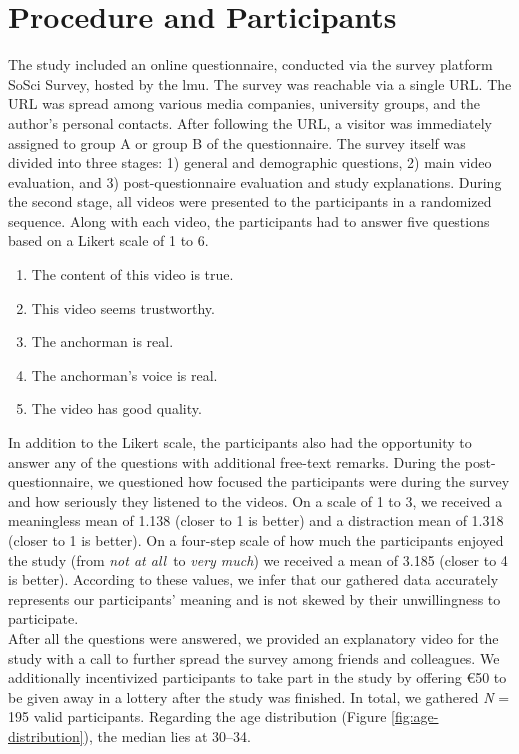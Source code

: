 \documentclass[
  a4paper,  %
  twoside,  %
  bibliography=totoc,
  headsepline,
  cleardoublepage=empty,
  parskip=half,
  draft=false
]{scrbook}
\begin{document}
\section{Procedure and Participants}
\label{sec:procedure-and-participants}

The study included an online questionnaire, conducted via the survey platform SoSci Survey, hosted by the \gls{lmu}. The survey was reachable via a single URL. The URL was spread among various media companies, university groups, and the author's personal contacts. After following the URL, a visitor was immediately assigned to group A or group B of the questionnaire. The survey itself was divided into three stages: 1) general and demographic questions, 2) main video evaluation, and 3) post-questionnaire evaluation and study explanations. During the second stage, all videos were presented to the participants in a randomized sequence. Along with each video, the participants had to answer five questions based on a Likert scale of 1 to 6.
\begin{enumerate}
  \item The content of this video is true.
  \item This video seems trustworthy.
  \item The anchorman is real.
  \item The anchorman's voice is real.
  \item The video has good quality.
\end{enumerate}
In addition to the Likert scale, the participants also had the opportunity to answer any of the questions with additional free-text remarks. During the post-questionnaire, we questioned how focused the participants were during the survey and how seriously they listened to the videos. On a scale of 1 to 3, we received a meaningless mean of 1.138 (closer to 1 is better) and a distraction mean of 1.318 (closer to 1 is better). On a four-step scale of how much the participants enjoyed the study (from \textit{not at all} to \textit{very much}) we received a mean of 3.185 (closer to 4 is better). According to these values, we infer that our gathered data accurately represents our participants' meaning and is not skewed by their unwillingness to participate. \\
After all the questions were answered, we provided an explanatory video for the study with a call to further spread the survey among friends and colleagues. We additionally incentivized participants to take part in the study by offering €50 to be given away in a lottery after the study was finished.
In total, we gathered \textit{N} = 195 valid participants. Regarding the age distribution (Figure \ref{fig:age-distribution}), the median lies at 30–34.
\end{document}
